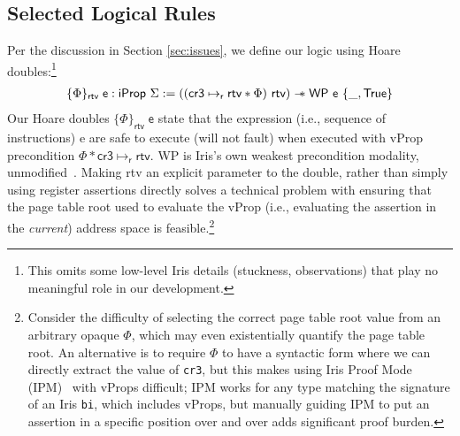 \subsection{Selected Logical Rules}
\label{sec:selected_rules}
Per the discussion in Section \ref{sec:issues}, we define our logic using Hoare doubles:\footnote{This
omits some low-level Iris details (stuckness, observations) that play no meaningful
role in our development.}
  \[
  \begin{array}{l}
    \{ \Phi \}_\mathsf{ rtv }\;\textsf{e} : \textsf{iProp }\Sigma := 
   ((\textsf{cr3} \mapsto_{\textsf{r}} \textsf{rtv} \ast \Phi) \textsf{ rtv}) \mathrel{-\!\!\ast} \textsf{WP e } \{\_, \textsf{True} \}
    \end{array}
  \]
Our Hoare doubles $\{\Phi\}_\textsf{rtv}\;\textsf{e}$ state that the expression (i.e., sequence of instructions)
\textsf{e} are safe to execute (will not fault)
when executed with \textsf{vProp} precondition $\Phi\ast\textsf{cr3}\mapsto_{\textsf{r}} \textsf{rtv}$.
\textsf{WP} is Iris's own weakest precondition modality, unmodified~\cite{jung2018iris}.
Making \textsf{rtv} an explicit parameter to the double, rather than simply using register assertions
directly solves a technical problem with ensuring that the page table root used to evaluate
the \textsf{vProp} (i.e., evaluating the assertion in the \emph{current}) address space
is feasible.\footnote{Consider the difficulty of selecting the correct page table root value from an arbitrary
opaque $\Phi$, which may even existentially quantify the page table root. An alternative is to
require $\Phi$ to have a syntactic form where we can directly extract the value of \lstinline|cr3|,
but this makes using Iris Proof Mode (IPM)~\cite{Krebbers:2017:IPH:3009837.3009855} with \textsf{vProps}
  difficult; IPM works for any type matching the signature of an Iris \lstinline|bi|, which includes
  \textsf{vProp}s, but manually guiding IPM to put an assertion in a specific position over and over adds
  significant proof burden.
}

